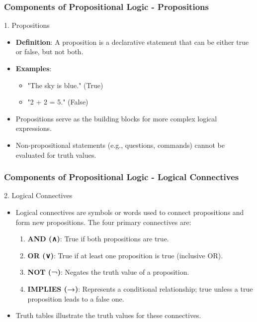 \documentclass[aspectratio=169]{beamer}
\begin{document}
\begin{frame}[fragile]
    \frametitle{Components of Propositional Logic - Propositions}
    \begin{block}{1. Propositions}
        \begin{itemize}
            \item \textbf{Definition}: A proposition is a declarative statement that can be either true or false, but not both.
            \item \textbf{Examples}:
                \begin{itemize}
                    \item "The sky is blue." (True)
                    \item "2 + 2 = 5." (False)
                \end{itemize}
            \item Propositions serve as the building blocks for more complex logical expressions.
            \item Non-propositional statements (e.g., questions, commands) cannot be evaluated for truth values.
        \end{itemize}
    \end{block}
\end{frame}

\begin{frame}[fragile]
    \frametitle{Components of Propositional Logic - Logical Connectives}
    \begin{block}{2. Logical Connectives}
        \begin{itemize}
            \item Logical connectives are symbols or words used to connect propositions and form new propositions. The four primary connectives are:
            \begin{enumerate}
                \item \textbf{AND (∧)}: True if both propositions are true.
                \item \textbf{OR (∨)}: True if at least one proposition is true (inclusive OR).
                \item \textbf{NOT (¬)}: Negates the truth value of a proposition.
                \item \textbf{IMPLIES (→)}: Represents a conditional relationship; true unless a true proposition leads to a false one.
            \end{enumerate}
            \item Truth tables illustrate the truth values for these connectives.
        \end{itemize}
    \end{block}
\end{frame}
\end{document}
